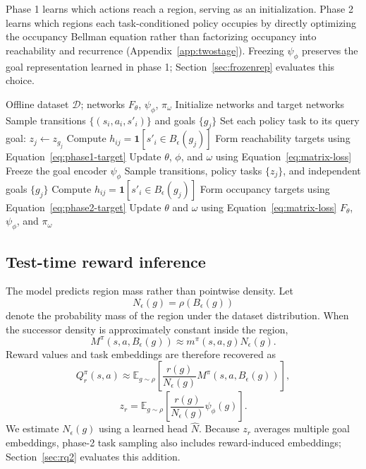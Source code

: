 \documentclass{article}
\newcommand{\E}{\mathbb{E}}
\newcommand{\ind}[1]{\mathbf{1}\!\left[#1\right]}
\newcommand{\Nhat}{\hat N}
\begin{document}
Phase 1 learns which actions reach a region, serving as an initialization. 
Phase 2 learns which regions each task-conditioned policy occupies by directly optimizing the occupancy Bellman equation rather than factorizing occupancy into reachability and recurrence
(Appendix~\ref{app:twostage}).
Freezing $\psi_\phi$ preserves the goal representation learned in phase 1; Section~\ref{sec:frozenrep} evaluates this choice.

\begin{algorithm}[t]
\caption{Region-based successor learning}
\label{alg:region-successor}
\small
\begin{algorithmic}[1]
\Require Offline dataset $\mathcal{D}$; networks $F_\theta$, $\psi_\phi$, $\pi_\omega$
\State Initialize networks and target networks
    \State Sample transitions $\{(s_i,a_i,s'_i)\}$ and goals $\{g_j\}$
    \State Set each policy task to its query goal: $z_j\gets z_{g_j}$
    \State Compute $h_{ij}=\ind{s'_i\in B_\epsilon(g_j)}$
    \State Form reachability targets using Equation~\ref{eq:phase1-target}
    \State Update $\theta$, $\phi$, and $\omega$ using Equation~\ref{eq:matrix-loss}
\EndFor
\State Freeze the goal encoder $\psi_\phi$
    \State Sample transitions, policy tasks $\{z_j\}$, and independent goals $\{g_j\}$
    \State Compute $h_{ij}=\ind{s'_i\in B_\epsilon(g_j)}$
    \State Form occupancy targets using Equation~\ref{eq:phase2-target}
    \State Update $\theta$ and $\omega$ using Equation~\ref{eq:matrix-loss}
\EndFor
\State \Return $F_\theta$, $\psi_\phi$, and $\pi_\omega$
\end{algorithmic}
\end{algorithm}

\subsection{Test-time reward inference}
\label{sec:readout}

The model predicts region mass rather than pointwise density.
Let
\begin{equation}
N_\epsilon(g) = \rho(B_\epsilon(g))
\end{equation}
denote the probability mass of the region under the dataset distribution.
When the successor density is approximately constant inside the region,
\begin{equation}
M^\pi(s,a,B_\epsilon(g)) \approx m^\pi(s,a,g)N_\epsilon(g).
\end{equation}
Reward values and task embeddings are therefore recovered as
\begin{equation}
\label{eq:readout}
Q_r^\pi(s,a) \approx \E_{g\sim\rho} \left[ \frac{r(g)}{N_\epsilon(g)} M^\pi(s,a,B_\epsilon(g)) \right],
\end{equation}
\begin{equation}
z_r = \E_{g\sim\rho} \left[ \frac{r(g)}{N_\epsilon(g)} \psi_\phi(g) \right].
\end{equation}
We estimate $N_\epsilon(g)$ using a learned head $\Nhat$.
Because $z_r$ averages multiple goal embeddings, phase-2 task sampling also includes reward-induced embeddings; Section~\ref{sec:rq2} evaluates this addition.
\end{document}
